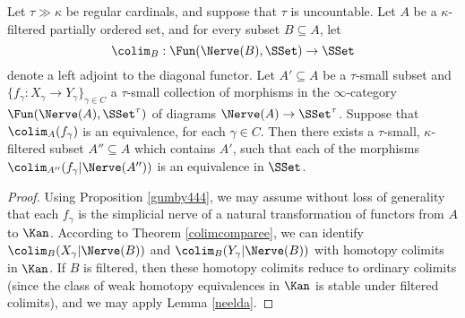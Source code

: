 \begin{lemma}\label{neeld}
Let $\tau \gg \kappa$ be regular cardinals, and suppose that $\tau$ is uncountable. Let $A$ be a $\kappa$-filtered partially ordered set, and for every subset $B \subseteq A$, let
$$ \colim_{B}: \Fun(\Nerve(B), \SSet) \rightarrow \SSet$$
denote a left adjoint to the diagonal functor. Let $A' \subseteq A$ be a $\tau$-small subset
and $\{ f_{\gamma}: X_{\gamma} \rightarrow Y_{\gamma} \}_{\gamma \in C}$ a $\tau$-small collection of morphisms in the $\infty$-category $\Fun(\Nerve(A), \SSet^{\tau})$ of
diagrams $\Nerve(A) \rightarrow \SSet^{\tau}$. Suppose that $\colim_A(f_{\gamma})$ is an
equivalence, for each $\gamma \in C$. Then there exists a $\tau$-small, $\kappa$-filtered subset
$A'' \subseteq A$ which contains $A'$, such that each of the morphisms
$\colim_{A''}(f_{\gamma} | \Nerve(A'' ))$ is an equivalence in $\SSet$.
\end{lemma}

\begin{proof}
Using Proposition \ref{gumby444}, we may assume without loss of generality that
each $f_{\gamma}$ is the simplicial nerve of a natural transformation of functors
from $A$ to $\Kan$. According to Theorem \ref{colimcomparee}, we can identify
$\colim_{B}( X_{\gamma} | \Nerve(B))$ and
$\colim_{B}( Y_{\gamma} | \Nerve(B))$ with homotopy colimits in $\Kan$. If $B$ is filtered, then these homotopy colimits reduce to ordinary colimits (since the class of weak homotopy equivalences in $\Kan$ is stable under filtered colimits), and we may apply Lemma \ref{neelda}.
\end{proof}

